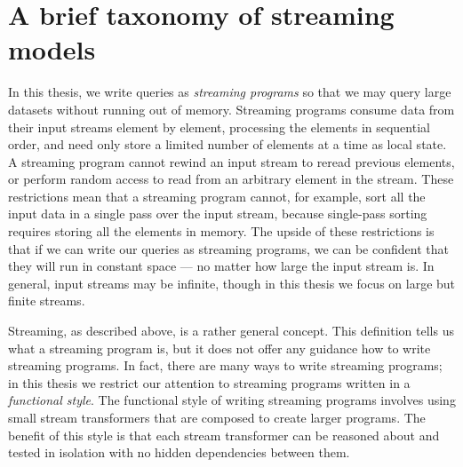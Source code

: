 \chapter{A brief taxonomy of streaming models}
\label{taxonomy}

In this thesis, we write queries as \emph{streaming programs} so that we may query large datasets without running out of memory.
Streaming programs consume data from their input streams element by element, processing the elements in sequential order, and need only store a limited number of elements at a time as local state.
A streaming program cannot rewind an input stream to reread previous elements, or perform random access to read from an arbitrary element in the stream.
These restrictions mean that a streaming program cannot, for example, sort all the input data in a single pass over the input stream, because single-pass sorting requires storing all the elements in memory.
The upside of these restrictions is that if we can write our queries as streaming programs, we can be confident that they will run in constant space --- no matter how large the input stream is.
In general, input streams may be infinite, though in this thesis we focus on large but finite streams.


Streaming, as described above, is a rather general concept.
This definition tells us what a streaming program is, but it does not offer any guidance how to write streaming programs.
In fact, there are many ways to write streaming programs; in this thesis we restrict our attention to streaming programs written in a \emph{functional style}.
The functional style of writing streaming programs involves using small stream transformers that are composed to create larger programs.
The benefit of this style is that each stream transformer can be reasoned about and tested in isolation with no hidden dependencies between them.

